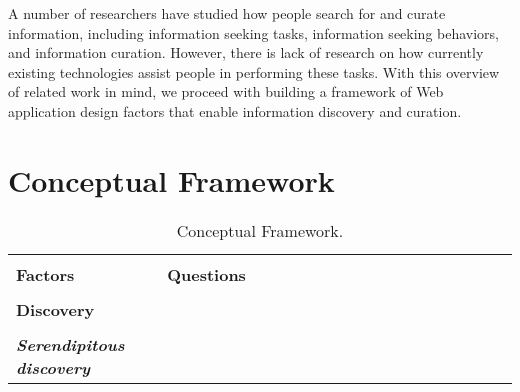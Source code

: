 \documentclass{casconpaper}
\begin{document}
{A number of researchers have studied how people search for and curate information, including information seeking tasks, information seeking behaviors, and information curation. However, there is lack of research on how currently existing technologies assist people in performing these tasks. With this overview of related work in mind, we proceed with building a framework of Web application design factors that enable information discovery and curation.
} %




{\section{Conceptual Framework}
\begin{table*}[htbp]
\caption{Conceptual Framework.}
\centering
\begin{tabular}{|p{0.30\linewidth}|p{0.70\linewidth}|}
\hline
&\\
\textbf{\large{Factors}}   & \textbf{\large{Questions}}  \\
\hline
&\\
\textbf{\large{Discovery}}                     &                                                                                                           \\

&\\
\emph{\textbf{Serendipitous discovery}}     &                                                                                                           \\


\end{tabular}
\end{table*}}
\end{document}
